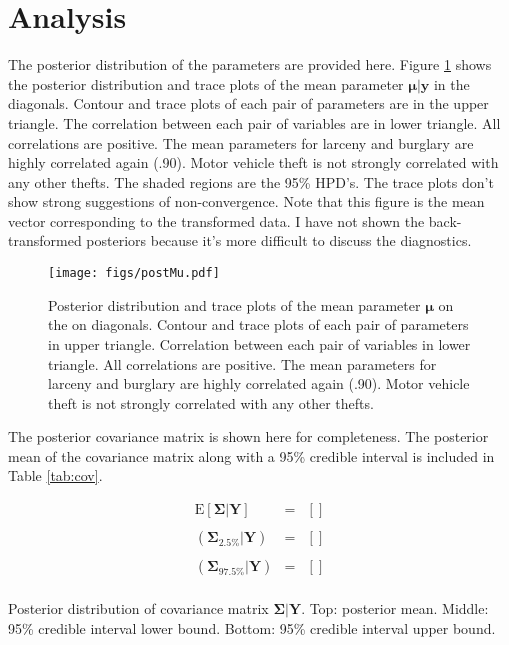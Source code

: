 \documentclass{../../tex_template/asaproc}
\newcommand{\bk}[1]{\left[#1\right]}
\newcommand{\E}{ \text{E} }
\begin{document}
\section{Analysis}
The posterior distribution of the parameters are provided here. Figure
\ref{fig:postMu} shows the posterior distribution and trace plots of the mean
parameter $\bm{\mu | y}$ in the diagonals. Contour and trace plots of each
pair of parameters are in the upper triangle. The correlation between each pair of
variables are in lower triangle.  All correlations are positive. The mean parameters
for larceny and burglary are highly correlated again (.90). Motor vehicle theft
is not strongly correlated with any other thefts. The shaded regions are the 95\% 
HPD's. The trace plots don't show strong suggestions of non-convergence. Note that
this figure is the mean vector corresponding to the transformed data. I have not
shown the back-transformed posteriors because it's more difficult to discuss the 
diagnostics.
\begin{figure}[H]
  \centering
  \texttt{[image: figs/postMu.pdf]}
  \caption{\small Posterior distribution and trace plots of the mean parameter
    $\bm\mu$ on the on diagonals. Contour and trace plots of each pair of
    parameters in upper triangle.  Correlation between each pair of variables
    in lower triangle.  All correlations are positive. The mean parameters for
    larceny and burglary are highly correlated again (.90). Motor vehicle theft
    is not strongly correlated with any other thefts.}
  \label{fig:postMu}
\end{figure}
The posterior covariance matrix is shown here for completeness. The posterior
mean of the covariance matrix along with a 95\% credible interval is included
in Table \ref{tab:cov}.

\begin{table}[H]
\[
\begin{array}{lll}
  \E[\bm\Sigma | \bm Y] &=& \bk{} \\
    \\
  (\bm\Sigma_{2.5\%}| \bm Y) &=& \bk{} \\
    \\
    (\bm\Sigma_{97.5\%} | \bm Y) &=& \bk{} \\
\end{array}
\]
\caption{Posterior distribution of covariance matrix $\bm{\Sigma | Y}$.
Top: posterior mean. Middle: 95\% credible interval lower bound.
Bottom: 95\% credible interval upper bound.}
\label{tab:cov}
\end{table}
\end{document}
